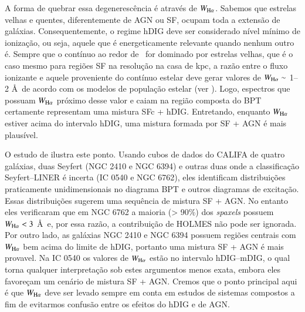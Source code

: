 A forma de quebrar essa degenerescência é através de $W_{\Ha}$. Sabemos que estrelas velhas e quentes, diferentemente de AGN ou SF, ocupam toda a extensão de galáxias. Consequentemente, o regime hDIG deve ser considerado nível mínimo de ionização, ou seja, aquele que é energeticamente relevante quando nenhum outro é. Sempre que o contínuo ao redor de \Ha\ for dominado por estrelas velhas, que é o caso mesmo para regiões SF na resolução na casa de kpc, a razão entre o fluxo ionizante e aquele proveniente do contínuo estelar deve gerar valores de $W_{\Ha} \sim$ 1--2 \AA\ de acordo com os modelos de população estelar (ver \citealt{CidFernandes.etal.2011a}). Logo, espectros que possuam $W_{\Ha}$ próximo desse valor e caiam na região composta do BPT certamente representam uma mistura SFc + hDIG. Entretando, enquanto $W_{\Ha}$ estiver acima do intervalo hDIG, uma mistura formada por SF + AGN é mais plausível.

O estudo de \citet{Davies.etal.2014} ilustra este ponto. Usando cubos de dados do CALIFA de quatro galáxias, duas  Seyfert (NGC 2410 e NGC 6394) e outras duas onde a classificação Seyfert--LINER é incerta (IC 0540 e NGC 6762), eles identificam distribuições praticamente unidimensionais no diagrama BPT e outros diagramas de excitação. Essas distribuições sugerem uma sequência de mistura SF + AGN. No entanto eles verificaram que em NGC 6762 a maioria (> 90\%) dos {\em spaxels} possuem $W_{\Ha} < 3$ \AA\ e, por essa razão, a contribuição de HOLMES não pode ser ignorada. Por outro lado, as galáxias NGC 2410 e NGC 6394 possuem regiões centrais com $W_{\Ha}$ bem acima do limite de hDIG, portanto uma mistura SF + AGN é mais provavel. Na IC 0540 os valores de $W_{\Ha}$ estão no intervalo hDIG--mDIG, o qual torna qualquer interpretação sob estes argumentos menos exata, embora eles favoreçam um cenário de mistura SF + AGN. Cremos que o ponto principal aqui é que $W_{\Ha}$ deve ser levado sempre em conta em estudos de sistemas compostos a fim de evitarmos confusão entre os efeitos do hDIG e de AGN.



